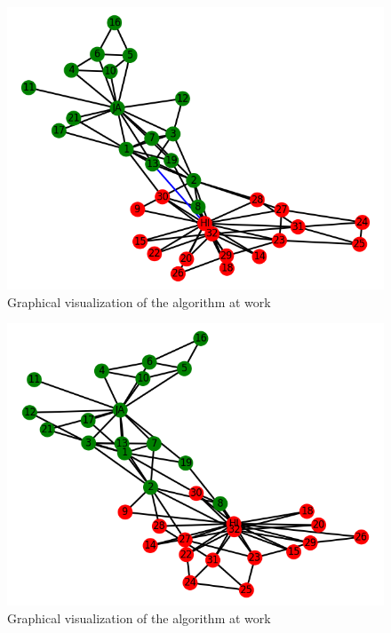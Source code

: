 \documentclass[11pt]{article}
\begin{document}
	\begin{figure}[h!]
		\includegraphics[scale=0.5]{resources/myplot16.png}
		\caption{Graphical visualization of the algorithm at work }
	\end{figure}
	\begin{figure}[h!]
		\includegraphics[scale=0.5]{resources/myplot15.png}
		\caption{Graphical visualization of the algorithm at work }
	\end{figure}
\end{document}
